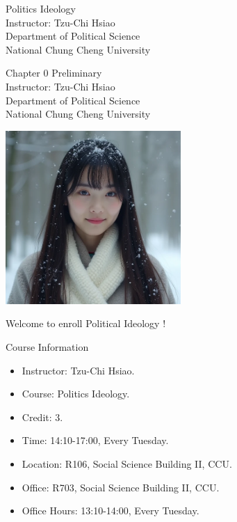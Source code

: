 \documentclass{beamer}
\title{}
\author{}
\date{}
\begin{document}
\begin{frame}
\begin{center}
\Large{Politics Ideology} \\
\vspace{3em}
\normalsize{Instructor: Tzu-Chi Hsiao} \\
\vspace{3em}
\small{Department of Political Science} \\
\vspace{1em}
\small{National Chung Cheng University}
\end{center}
\end{frame}
\begin{frame}
\begin{center}
\Large{Chapter 0 Preliminary} \\
\vspace{3em}
\normalsize{Instructor: Tzu-Chi Hsiao} \\
\vspace{3em}
\small{Department of Political Science} \\
\vspace{1em}
\small{National Chung Cheng University} \\
\end{center}
\end{frame}
\begin{frame}{}
\begin{center}
\includegraphics[width=0.5\textwidth]{instructor.png}
\end{center}
\vspace{1em}
\begin{center}
\Large{Welcome to enroll Political Ideology !}
\end{center}
\end{frame}
\begin{frame}{Course Information}
\begin{itemize}
\item Instructor: Tzu-Chi Hsiao.
\item Course: Politics Ideology.
\item Credit: 3.
\item Time: 14:10-17:00, Every Tuesday.
\item Location: R106, Social Science Building II, CCU. 
\item Office: R703, Social Science Building II, CCU.
\item Office Hours: 13:10-14:00, Every Tuesday.
\end{itemize}
\end{frame}
\end{document}
